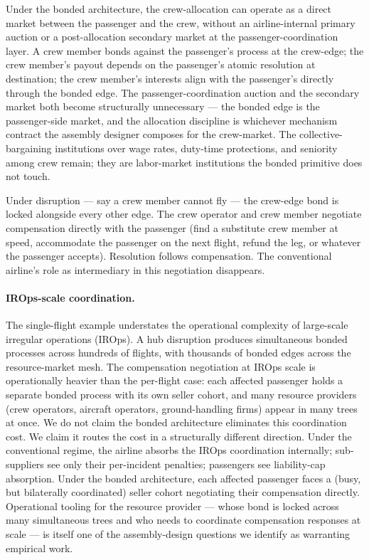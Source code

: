 \documentclass[11pt,a4paper]{article}
\theoremstyle{definition}
\theoremstyle{remark}
\begin{document}
Under the bonded architecture, the crew-allocation can operate as
a direct market between the passenger and the crew, without an
airline-internal primary auction or a post-allocation secondary
market at the passenger-coordination layer. A crew member bonds
against the passenger's process at the crew-edge; the crew
member's payout depends on the passenger's atomic resolution at
destination; the crew member's interests align with the
passenger's directly through the bonded edge. The
passenger-coordination auction and the secondary market both
become structurally unnecessary --- the bonded edge is the
passenger-side market, and the allocation discipline is whichever
mechanism contract the assembly designer composes for the
crew-market. The collective-bargaining institutions over wage
rates, duty-time protections, and seniority among crew remain;
they are labor-market institutions the bonded primitive does not
touch.

Under disruption --- say a crew member cannot fly --- the
crew-edge bond is locked alongside every other edge. The crew
operator and crew member negotiate compensation directly with the
passenger (find a substitute crew member at speed, accommodate
the passenger on the next flight, refund the leg, or whatever the
passenger accepts). Resolution follows compensation. The
conventional airline's role as intermediary in this negotiation
disappears.

\paragraph{IROps-scale coordination.}
The single-flight example understates the operational complexity
of large-scale irregular operations (IROps). A hub disruption
produces simultaneous bonded processes across hundreds of
flights, with thousands of bonded edges across the resource-market
mesh. The compensation negotiation at IROps scale is
operationally heavier than the per-flight case: each affected
passenger holds a separate bonded process with its own seller
cohort, and many resource providers (crew operators, aircraft
operators, ground-handling firms) appear in many trees at once.
We do not claim the bonded architecture eliminates this
coordination cost. We claim it routes the cost in a structurally
different direction. Under the conventional regime, the airline
absorbs the IROps coordination internally; sub-suppliers see only
their per-incident penalties; passengers see liability-cap
absorption. Under the bonded architecture, each affected
passenger faces a (busy, but bilaterally coordinated) seller
cohort negotiating their compensation directly. Operational
tooling for the resource provider --- whose bond is locked across
many simultaneous trees and who needs to coordinate compensation
responses at scale --- is itself one of the assembly-design
questions we identify as warranting empirical work.
\end{document}
